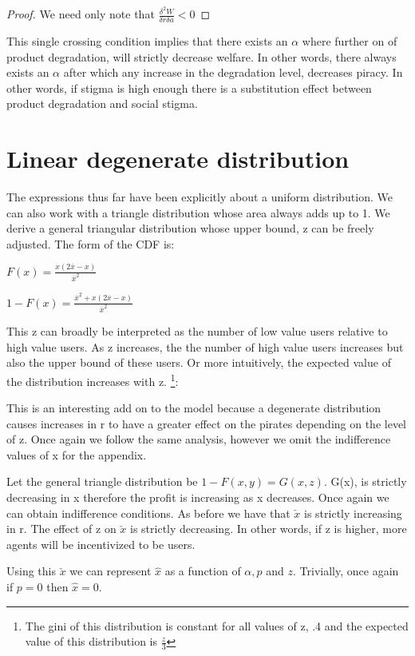 \documentclass{article}
\begin{document}
\begin{proof}
We need only note that $\frac{\delta^2 W}{\delta r \delta a}<0$
\end{proof}

This single crossing condition implies that there exists an $\alpha$ where further on of product degradation, will strictly decrease welfare. In other words, there always exists an $\alpha$ after which any increase in the degradation level, decreases piracy. In other words, if stigma is high enough there is a substitution effect between product degradation and social stigma. 

\section{Linear degenerate distribution}


The expressions thus far have been explicitly about a uniform distribution. We can also work with a triangle distribution whose area always adds up to 1. We derive a general triangular distribution whose upper bound, z can be freely adjusted. The form of the CDF is: 

$F(x) = \frac{x(2\overline{x}-x)}{\overline{x}^2}$

$1-F(x) = \frac{\overline{x}^2+ x(2\overline{x}-x)}{\overline{x}^2}$

This z can broadly be interpreted as the number of low value users relative to high value users. As z increases, the the number of high value users increases but also the upper bound of these users. Or more intuitively, the expected value of the distribution increases with z. \footnote{The gini of this distribution is constant for all values of z, .4 and the expected value of this distribution is $\frac{z}{3}$}:  

This is an interesting add on to the model because a degenerate distribution causes increases in r to have a greater effect on the pirates depending on the level of z. Once again we follow the same analysis, however we omit the indifference values of x for the appendix. 

Let the general triangle distribution be $1-F(x,y)=G(x,z)$. G(x), is strictly decreasing in x therefore the profit is increasing as x decreases.  
Once again we can obtain indifference conditions. As before we have that $\check{x}$ is strictly increasing in r. The effect of z on $\check{x}$ is strictly decreasing. In other words, if z is higher, more agents will be incentivized to be users. 

Using this $\check{x}$ we can represent $\hat{x}$ as a function of $\alpha, p$ and $z$. Trivially, once again if $p=0$ then $\hat{x}=0$. 
\end{document}
